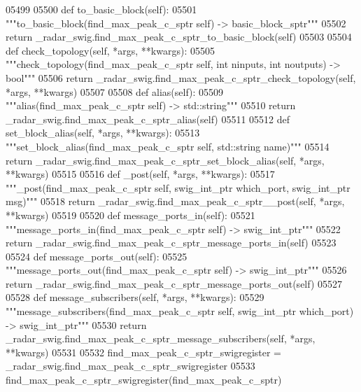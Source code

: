 \begin{DoxyCode}
{{{{{{{{{{{{{{{{{{05499 
05500     \textcolor{keyword}{def }to_basic_block(self):
05501         \textcolor{stringliteral}{"""to\_basic\_block(find\_max\_peak\_c\_sptr self) -> basic\_block\_sptr"""}
05502         \textcolor{keywordflow}{return} \_radar\_swig.find\_max\_peak\_c\_sptr\_to\_basic\_block(self)
05503 
05504     \textcolor{keyword}{def }check_topology(self, *args, **kwargs):
05505         \textcolor{stringliteral}{"""check\_topology(find\_max\_peak\_c\_sptr self, int ninputs, int noutputs) -> bool"""}
05506         \textcolor{keywordflow}{return} \_radar\_swig.find\_max\_peak\_c\_sptr\_check\_topology(self, *args, **kwargs)
05507 
05508     \textcolor{keyword}{def }alias(self):
05509         \textcolor{stringliteral}{"""alias(find\_max\_peak\_c\_sptr self) -> std::string"""}
05510         \textcolor{keywordflow}{return} \_radar\_swig.find\_max\_peak\_c\_sptr\_alias(self)
05511 
05512     \textcolor{keyword}{def }set_block_alias(self, *args, **kwargs):
05513         \textcolor{stringliteral}{"""set\_block\_alias(find\_max\_peak\_c\_sptr self, std::string name)"""}
05514         \textcolor{keywordflow}{return} \_radar\_swig.find\_max\_peak\_c\_sptr\_set\_block\_alias(self, *args, **kwargs)
05515 
05516     \textcolor{keyword}{def }_post(self, *args, **kwargs):
05517         \textcolor{stringliteral}{"""\_post(find\_max\_peak\_c\_sptr self, swig\_int\_ptr which\_port, swig\_int\_ptr msg)"""}
05518         \textcolor{keywordflow}{return} \_radar\_swig.find\_max\_peak\_c\_sptr\_\_post(self, *args, **kwargs)
05519 
05520     \textcolor{keyword}{def }message_ports_in(self):
05521         \textcolor{stringliteral}{"""message\_ports\_in(find\_max\_peak\_c\_sptr self) -> swig\_int\_ptr"""}
05522         \textcolor{keywordflow}{return} \_radar\_swig.find\_max\_peak\_c\_sptr\_message\_ports\_in(self)
05523 
05524     \textcolor{keyword}{def }message_ports_out(self):
05525         \textcolor{stringliteral}{"""message\_ports\_out(find\_max\_peak\_c\_sptr self) -> swig\_int\_ptr"""}
05526         \textcolor{keywordflow}{return} \_radar\_swig.find\_max\_peak\_c\_sptr\_message\_ports\_out(self)
05527 
05528     \textcolor{keyword}{def }message_subscribers(self, *args, **kwargs):
05529         \textcolor{stringliteral}{"""message\_subscribers(find\_max\_peak\_c\_sptr self, swig\_int\_ptr which\_port) -> swig\_int\_ptr"""}
05530         \textcolor{keywordflow}{return} \_radar\_swig.find\_max\_peak\_c\_sptr\_message\_subscribers(self, *args, **kwargs)
05531 
05532 find\_max\_peak\_c\_sptr\_swigregister = \_radar\_swig.find\_max\_peak\_c\_sptr\_swigregister
05533 find_max_peak_c_sptr_swigregister(find\_max\_peak\_c\_sptr)
}}}}}}}}}}}}}}}}}}
\end{DoxyCode}

